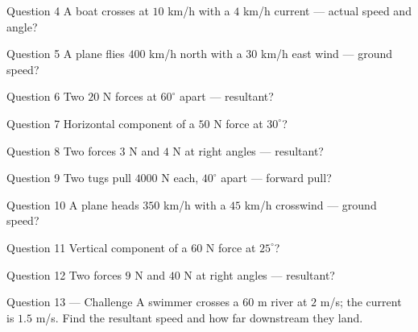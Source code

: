 \documentclass[11pt]{article}
\begin{document}
\begin{qbox}{Question 4}
A boat crosses at $10$ km/h with a $4$ km/h current — actual speed and angle?\workspace{2.4cm}
\end{qbox}

\begin{qbox}{Question 5}
A plane flies $400$ km/h north with a $30$ km/h east wind — ground speed?\workspace{2.4cm}
\end{qbox}

\begin{qbox}{Question 6}
Two $20$ N forces at $60^\circ$ apart — resultant?\workspace{2.4cm}
\end{qbox}

\begin{qbox}{Question 7}
Horizontal component of a $50$ N force at $30^\circ$?\workspace{2.4cm}
\end{qbox}

\begin{qbox}{Question 8}
Two forces $3$ N and $4$ N at right angles — resultant?\workspace{2.4cm}
\end{qbox}

\begin{qbox}{Question 9}
Two tugs pull $4000$ N each, $40^\circ$ apart — forward pull?\workspace{2.4cm}
\end{qbox}

\begin{qbox}{Question 10}
A plane heads $350$ km/h with a $45$ km/h crosswind — ground speed?\workspace{2.4cm}
\end{qbox}

\begin{qbox}{Question 11}
Vertical component of a $60$ N force at $25^\circ$?\workspace{2.4cm}
\end{qbox}

\begin{qbox}{Question 12}
Two forces $9$ N and $40$ N at right angles — resultant?\workspace{2.4cm}
\end{qbox}

\begin{qbox}{Question 13 --- Challenge}
A swimmer crosses a $60$ m river at $2$ m/s; the current is $1.5$ m/s. Find the resultant speed and how far downstream they land.\workspace{3.4cm}
\end{qbox}

\clearpage
{}
\end{document}
